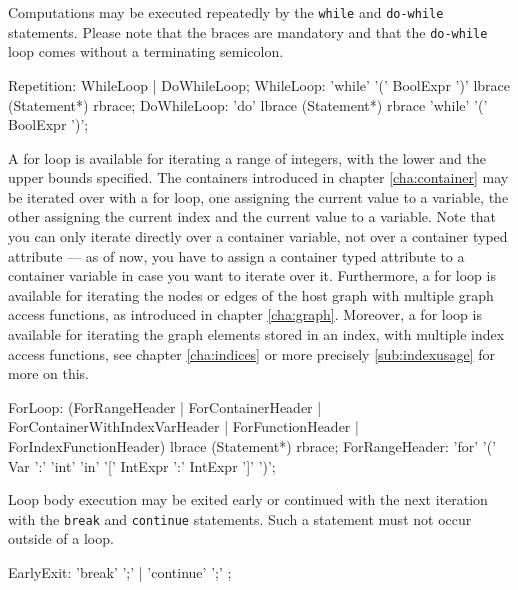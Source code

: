 Computations may be executed repeatedly by the \texttt{while} and \texttt{do-while} statements. Please note that the braces are mandatory and that the \texttt{do-while} loop comes without a terminating semicolon.

\begin{rail} 
  Repetition: WhileLoop | DoWhileLoop;
	WhileLoop: 'while' '(' BoolExpr ')' lbrace (Statement*) rbrace;
	DoWhileLoop: 'do' lbrace (Statement*) rbrace 'while' '(' BoolExpr ')';
\end{rail}


A for loop is available for iterating a range of integers, with the lower and the upper bounds specified.
The containers introduced in chapter \ref{cha:container} may be iterated over with a for loop, one assigning the current value to a variable, the other assigning the current index and the current value to a variable.
Note that you can only iterate directly over a container variable, not over a container typed attribute --- as of now, you have to assign a container typed attribute to a container variable in case you want to iterate over it.
Furthermore, a for loop is available for iterating the nodes or edges of the host graph with multiple graph access functions, as introduced in chapter \ref{cha:graph}. 
Moreover, a for loop is available for iterating the graph elements stored in an index, with multiple index access functions, see chapter \ref{cha:indices} or more precisely \ref{sub:indexusage} for more on this.
\begin{rail}
  ForLoop: (ForRangeHeader | ForContainerHeader | ForContainerWithIndexVarHeader | ForFunctionHeader | ForIndexFunctionHeader) lbrace (Statement*) rbrace;
  ForRangeHeader: 'for' '(' Var ':' 'int' 'in' '[' IntExpr ':' IntExpr ']' ')';
\end{rail}

Loop body execution may be exited early or continued with the next iteration with the \texttt{break} and \texttt{continue} statements. Such a statement must not occur outside of a loop.

\begin{rail} 
  EarlyExit: 
	'break' ';' |	'continue' ';'
	;
\end{rail}

